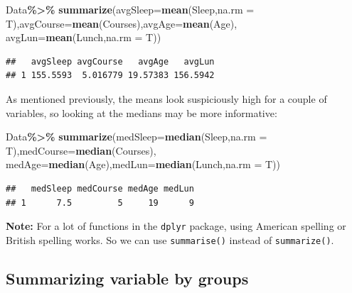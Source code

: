 \documentclass[
]{book}
\newenvironment{Shaded}{\begin{snugshade}}{\end{snugshade}}
\newcommand{\AttributeTok}[1]{\textcolor[rgb]{0.13,0.29,0.53}{#1}}
\newcommand{\FunctionTok}[1]{\textcolor[rgb]{0.13,0.29,0.53}{\textbf{#1}}}
\newcommand{\NormalTok}[1]{#1}
\newcommand{\SpecialCharTok}[1]{\textcolor[rgb]{0.81,0.36,0.00}{\textbf{#1}}}
\begin{document}
\begin{Shaded}
\begin{Highlighting}[]
\NormalTok{Data}\SpecialCharTok{\%\textgreater{}\%}
  \FunctionTok{summarize}\NormalTok{(}\AttributeTok{avgSleep=}\FunctionTok{mean}\NormalTok{(Sleep,}\AttributeTok{na.rm =}\NormalTok{ T),}\AttributeTok{avgCourse=}\FunctionTok{mean}\NormalTok{(Courses),}\AttributeTok{avgAge=}\FunctionTok{mean}\NormalTok{(Age),}
            \AttributeTok{avgLun=}\FunctionTok{mean}\NormalTok{(Lunch,}\AttributeTok{na.rm =}\NormalTok{ T))}
\end{Highlighting}
\end{Shaded}

\begin{verbatim}
##   avgSleep avgCourse   avgAge   avgLun
## 1 155.5593  5.016779 19.57383 156.5942
\end{verbatim}

As mentioned previously, the means look suspiciously high for a couple of variables, so looking at the medians may be more informative:

\begin{Shaded}
\begin{Highlighting}[]
\NormalTok{Data}\SpecialCharTok{\%\textgreater{}\%}
  \FunctionTok{summarize}\NormalTok{(}\AttributeTok{medSleep=}\FunctionTok{median}\NormalTok{(Sleep,}\AttributeTok{na.rm =}\NormalTok{ T),}\AttributeTok{medCourse=}\FunctionTok{median}\NormalTok{(Courses),}
            \AttributeTok{medAge=}\FunctionTok{median}\NormalTok{(Age),}\AttributeTok{medLun=}\FunctionTok{median}\NormalTok{(Lunch,}\AttributeTok{na.rm =}\NormalTok{ T))}
\end{Highlighting}
\end{Shaded}

\begin{verbatim}
##   medSleep medCourse medAge medLun
## 1      7.5         5     19      9
\end{verbatim}

\textbf{Note:} For a lot of functions in the \texttt{dplyr} package, using American spelling or British spelling works. So we can use \texttt{summarise()} instead of \texttt{summarize()}.

\hypertarget{summarizing-variable-by-groups-1}{%
\subsection{Summarizing variable by groups}\label{summarizing-variable-by-groups-1}}
\end{document}
